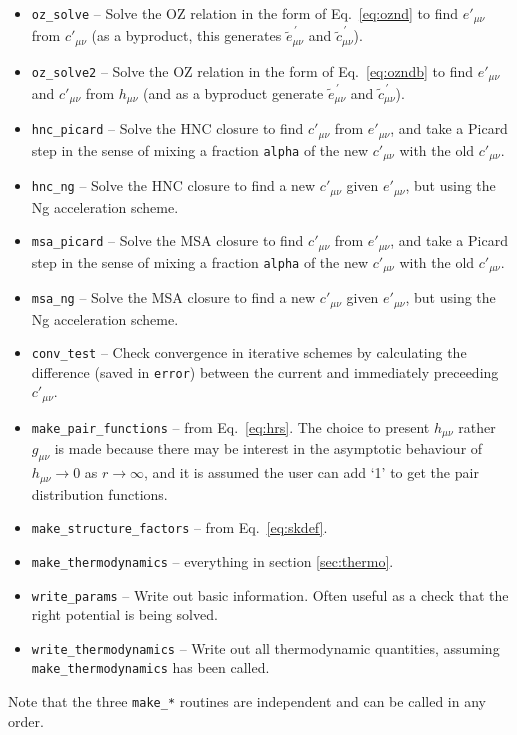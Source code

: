 \documentclass[12pt,a4paper]{article}
\newcommand{\myprime}{^{{}\,\prime}}
\newcommand{\Eqref}[1]{Eq.~\eqref{#1}}
\newcommand{\Eqsref}[1]{Eqs.~\eqref{#1}}
\begin{document}
\begin{itemize}
  first solving the MSA or RPA.  This involves \Eqsref{eq:exp} and
  \eqref{eq:ozndb} (the latter involves a call to \verb+oz_solve2+).
  Provided the flag \verb+auto_fns+ is set, the three \verb+make_*+
  functions are also called.
%
\item\verb+oz_solve+ -- Solve the OZ relation in the form of
  \Eqref{eq:oznd} to find $e'_{\mu\nu}$ from $c'_{\mu\nu}$ (as a
  byproduct, this generates ${\tilde e}_{\mu\nu}\myprime$ and ${\tilde
    c}_{\mu\nu}\myprime$).
%
\item\verb+oz_solve2+ -- Solve the OZ relation in the form of
  \Eqref{eq:ozndb} to find $e'_{\mu\nu}$ and $c'_{\mu\nu}$ from
  $h_{\mu\nu}$ (and as a byproduct generate ${\tilde
    e}_{\mu\nu}\myprime$ and ${\tilde c}_{\mu\nu}\myprime$).
%
\item\verb+hnc_picard+ -- Solve the HNC closure to find $c'_{\mu\nu}$
  from $e'_{\mu\nu}$, and take a Picard step in the sense of mixing a
  fraction \verb+alpha+ of the new $c'_{\mu\nu}$ with the old
  $c'_{\mu\nu}$.
%
\item\verb+hnc_ng+ -- Solve the HNC closure to find a new
$c'_{\mu\nu}$ given $e'_{\mu\nu}$, but using the Ng acceleration scheme.
%
\item\verb+msa_picard+ -- Solve the MSA closure to find $c'_{\mu\nu}$
  from $e'_{\mu\nu}$, and take a Picard step in the sense of mixing a
  fraction \verb+alpha+ of the new $c'_{\mu\nu}$ with the old
  $c'_{\mu\nu}$.
%
\item\verb+msa_ng+ -- Solve the MSA closure to find a new
$c'_{\mu\nu}$ given $e'_{\mu\nu}$, but using the Ng acceleration scheme.
%
\item\verb+conv_test+ -- Check convergence in iterative schemes by
  calculating the difference (saved in \verb+error+) between the
  current and immediately preceeding $c'_{\mu\nu}$.
%
\item\verb+make_pair_functions+ -- from \Eqref{eq:hrs}.  The
  choice to present $h_{\mu\nu}$ rather $g_{\mu\nu}$ is made because
  there may be interest in the asymptotic behaviour of
  $h_{\mu\nu}\to0$ as $r\to\infty$, and it is assumed the user can add
  `1' to get the pair distribution functions.
%
\item\verb+make_structure_factors+ -- from \Eqref{eq:skdef}.
%
\item\verb+make_thermodynamics+ -- everything in section
  \ref{sec:thermo}.
%
\item\verb+write_params+ -- Write out basic information.  Often useful
  as a check that the right potential is being solved.
%
\item\verb+write_thermodynamics+ -- Write out all thermodynamic
  quantities, assuming \verb+make_thermodynamics+ has been called.
%
\end{itemize}
%
Note that the three \verb+make_*+ routines are independent and can be
called in any order.
\end{document}
